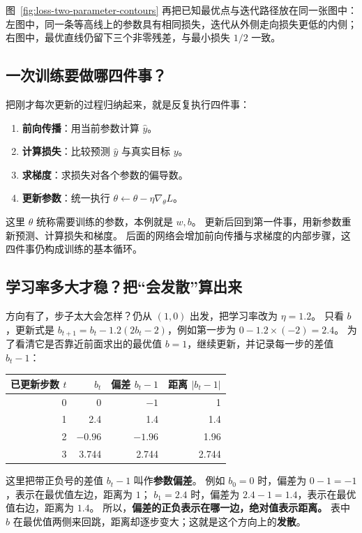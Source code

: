 图~\ref{fig:loss-two-parameter-contours} 再把已知最优点与迭代路径放在同一张图中：
左图中，同一条等高线上的参数具有相同损失，迭代从外侧走向损失更低的内侧；
右图中，最优直线仍留下三个非零残差，与最小损失 $1/2$ 一致。


\subsection{一次训练要做哪四件事？}
\label{intro:training-four-steps}

把刚才每次更新的过程归纳起来，就是反复执行四件事：
\begin{enumerate}
\item \textbf{前向传播}：用当前参数计算 $\widehat{y}$。
\item \textbf{计算损失}：比较预测 $\widehat{y}$ 与真实目标 $y$。
\item \textbf{求梯度}：求损失对各个参数的偏导数。
\item \textbf{更新参数}：统一执行 $\theta\leftarrow\theta-\eta\nabla_\theta L$。
\end{enumerate}
这里 $\theta$ 统称需要训练的参数，本例就是 $w,b$。
更新后回到第一件事，用新参数重新预测、计算损失和梯度。
后面的网络会增加前向传播与求梯度的内部步骤，这四件事仍构成训练的基本循环。\label{route:gradient-end}

\subsection{学习率多大才稳？把“会发散”算出来}
\label{experiment:learning-rate-stability}

方向有了，步子太大会怎样？仍从 $(1,0)$ 出发，把学习率改为 $\eta=1.2$。
只看 $b$，更新式是 $b_{t+1}=b_t-1.2(2b_t-2)$，例如第一步为 $0-1.2\times(-2)=2.4$。
为了看清它是否靠近前面求出的最优值 $b=1$，继续更新，并记录每一步的差值 $b_t-1$：
\begin{center}\small
{}
\begin{tabular}{rrrr}
\toprule
已更新步数 $t$ & $b_t$ & 偏差 $b_t-1$ & 距离 $|b_t-1|$\\\midrule
0 & 0 & $-1$ & 1\\
1 & 2.4 & 1.4 & 1.4\\
2 & $-0.96$ & $-1.96$ & 1.96\\
3 & 3.744 & 2.744 & 2.744\\
\bottomrule
\end{tabular}
\end{center}
这里把带正负号的差值 $b_t-1$ 叫作\textbf{参数偏差}。
例如 $b_0=0$ 时，偏差为 $0-1=-1$，表示在最优值左边，距离为 $1$；
$b_1=2.4$ 时，偏差为 $2.4-1=1.4$，表示在最优值右边，距离为 $1.4$。
所以，\textbf{偏差的正负表示在哪一边，绝对值表示距离。}
表中 $b$ 在最优值两侧来回跳，距离却逐步变大；这就是这个方向上的\textbf{发散}。

